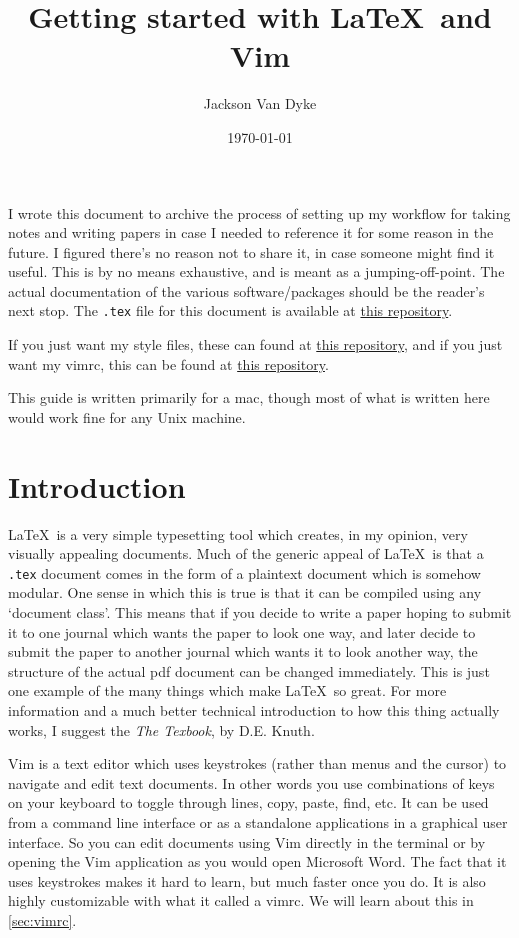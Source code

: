 \documentclass{amsart}
\begin{document}
\title{Getting started with \LaTeX\ and Vim}
\author{Jackson Van Dyke}
\date{\today}
\maketitle
\tableofcontents

I wrote this document to archive the process of setting up my workflow for taking notes
and writing papers in case I needed to reference it for some reason in the future. 
I figured there's no reason not to share it, in case someone might find it useful.
This is by no means exhaustive, and is meant as a jumping-off-point. The actual
documentation of the various software/packages should be the reader's next stop.
The \texttt{.tex} file for this document is available at 
\href{https://github.com/jacksontvd/getting_started_latex_vim}{this repository}.

If you just want my style files, these can found at 
\href{https://github.com/jacksontvd/tex}{this repository}, and if you just want my vimrc,
this can be found at \href{https://github.com/jacksontvd/vim}{this repository}.

This guide is written primarily for a mac, though most of what is written here would work
fine for any Unix machine.

\section{Introduction}

\LaTeX\ is a very simple typesetting tool which creates, in my opinion, very visually
appealing documents. Much of the generic appeal of \LaTeX\ is that a \texttt{.tex} document
comes in the form of a plaintext document which is somehow modular.
One sense in which this is true is that it can be compiled using any `document class'.
This means that if you decide to write a paper hoping to submit it to one journal which
wants the paper to look one way, and later decide to submit the paper to another journal
which wants it to look another way, the structure of the actual pdf document can be
changed immediately. This is just one example of the many things which make \LaTeX\ so
great. For more information and a much better technical introduction to how this thing
actually works, I suggest the \textit{The Texbook}, by D.E. Knuth. 

Vim is a text editor which uses keystrokes (rather than menus and the cursor) to navigate and edit text documents. 
In other words you use combinations of keys on your keyboard to toggle through lines,
copy, paste, find, etc.
It can be used from a command line interface or as a standalone applications in 
a graphical user interface. So you can edit documents using Vim directly in the terminal
or by opening the Vim application as you would open Microsoft Word. 
The fact that it uses keystrokes makes it hard to learn, but much faster once you do. 
It is also highly customizable with what it called a vimrc. We will learn about this
in \cref{sec:vimrc}.
\end{document}
